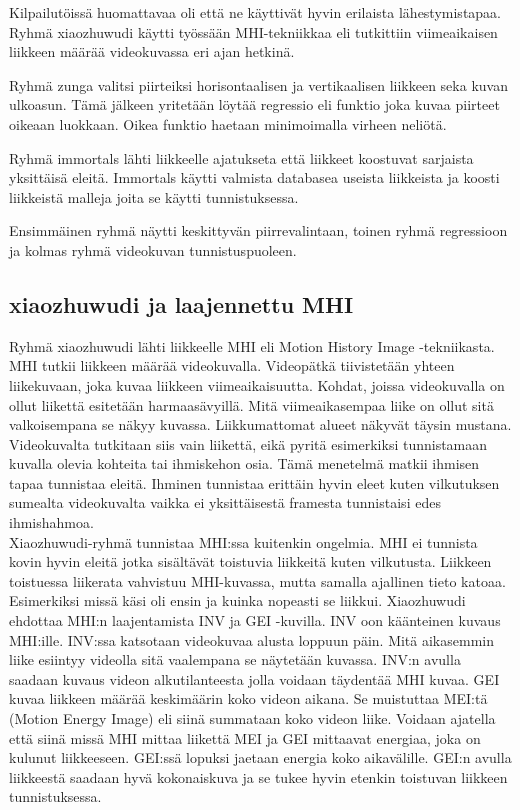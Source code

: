 Kilpailutöissä huomattavaa oli että ne käyttivät hyvin erilaista lähestymistapaa. 
Ryhmä xiaozhuwudi käytti työssään MHI-tekniikkaa eli tutkittiin viimeaikaisen liikkeen määrää videokuvassa eri ajan hetkinä.

Ryhmä zunga valitsi piirteiksi horisontaalisen ja vertikaalisen liikkeen seka kuvan ulkoasun. Tämä jälkeen yritetään löytää
regressio eli funktio joka kuvaa piirteet oikeaan luokkaan. Oikea funktio haetaan minimoimalla virheen neliötä.

Ryhmä immortals lähti liikkeelle ajatukseta että liikkeet koostuvat sarjaista yksittäisä eleitä.
Immortals käytti valmista databasea useista liikkeista ja koosti liikkeistä malleja joita se käytti tunnistuksessa.

Ensimmäinen ryhmä näytti keskittyvän piirrevalintaan, toinen ryhmä regressioon ja kolmas ryhmä videokuvan tunnistuspuoleen.

\subsection{xiaozhuwudi ja laajennettu MHI}
Ryhmä xiaozhuwudi lähti liikkeelle MHI eli Motion History Image -tekniikasta. MHI tutkii liikkeen määrää videokuvalla.
Videopätkä tiivistetään yhteen liikekuvaan, joka kuvaa liikkeen viimeaikaisuutta. Kohdat, joissa videokuvalla on ollut
liikettä esitetään harmaasävyillä. Mitä viimeaikasempaa liike on ollut sitä valkoisempana se näkyy kuvassa. Liikkumattomat
alueet näkyvät täysin mustana. Videokuvalta tutkitaan siis vain liikettä, eikä pyritä esimerkiksi tunnistamaan kuvalla olevia kohteita
tai ihmiskehon osia. Tämä menetelmä matkii ihmisen tapaa tunnistaa eleitä. Ihminen tunnistaa erittäin hyvin eleet kuten vilkutuksen 
sumealta videokuvalta vaikka ei yksittäisestä framesta tunnistaisi edes ihmishahmoa.  \\

Xiaozhuwudi-ryhmä tunnistaa MHI:ssa kuitenkin ongelmia. MHI ei tunnista kovin hyvin eleitä jotka sisältävät toistuvia liikkeitä kuten vilkutusta.
Liikkeen toistuessa liikerata vahvistuu MHI-kuvassa, mutta samalla ajallinen tieto katoaa. Esimerkiksi missä käsi oli ensin ja kuinka nopeasti se liikkui.
Xiaozhuwudi ehdottaa MHI:n laajentamista INV ja GEI -kuvilla. INV oon käänteinen kuvaus MHI:ille. INV:ssa katsotaan videokuvaa alusta loppuun päin.
Mitä aikasemmin liike esiintyy videolla sitä vaalempana se näytetään kuvassa. INV:n avulla saadaan kuvaus videon alkutilanteesta jolla voidaan
täydentää MHI kuvaa. GEI kuvaa liikkeen määrää keskimäärin koko videon aikana. Se muistuttaa MEI:tä (Motion Energy Image) eli siinä summataan
koko videon liike. Voidaan ajatella että siinä missä MHI mittaa liikettä MEI ja GEI mittaavat energiaa, joka on kulunut liikkeeseen. GEI:ssä 
lopuksi jaetaan energia koko aikavälille. GEI:n avulla liikkeestä saadaan hyvä kokonaiskuva ja se tukee hyvin etenkin toistuvan liikkeen tunnistuksessa. \\

